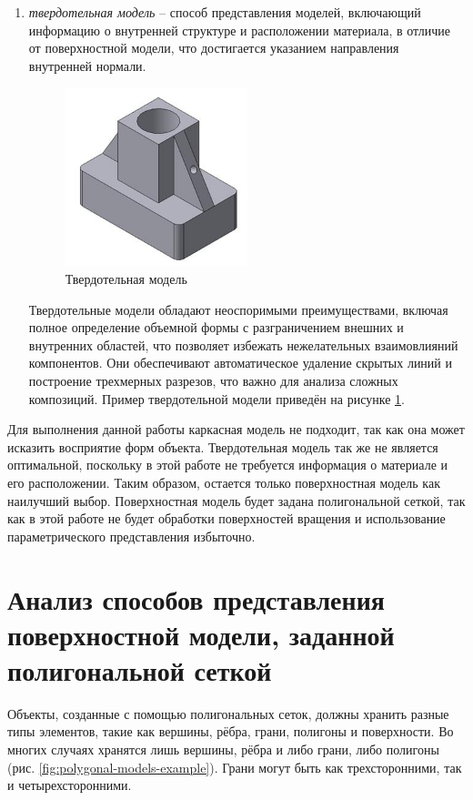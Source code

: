 \begin{enumerate}
	\item \textit{твердотельная модель} -- способ представления моделей, включающий информацию о внутренней структуре и расположении материала, в отличие от поверхностной модели, что достигается указанием направления внутренней нормали.
	\begin{figure}[h] 
		\centering
		\includegraphics[width=0.5\textwidth]{images/solidum-statu-models.png}
		\caption{Твердотельная модель} 
		\label{fig:solidum-statu-models} 
	\end{figure}
	Твердотельные модели обладают неоспоримыми преимуществами, включая полное определение объемной формы с разграничением внешних и внутренних областей, что позволяет избежать нежелательных взаимовлияний компонентов. Они обеспечивают автоматическое удаление скрытых линий и построение трехмерных разрезов, что важно для анализа сложных композиций. Пример твердотельной модели приведён на рисунке \ref{fig:solidum-statu-models}.
\end{enumerate}
	
Для выполнения данной работы каркасная модель не подходит, так как она может исказить восприятие форм объекта. Твердотельная модель так же не является оптимальной, поскольку в этой работе не требуется информация о материале и его расположении. Таким образом, остается только поверхностная модель как наилучший выбор. Поверхностная модель будет задана полигональной сеткой, так как в этой работе не будет обработки поверхностей вращения и использование параметрического представления избыточно.

\section{Анализ способов представления поверхностной модели, заданной полигональной сеткой}

Объекты, созданные с помощью полигональных сеток, должны хранить разные типы элементов, такие как вершины, рёбра, грани, полигоны и поверхности. Во многих случаях хранятся лишь вершины, рёбра и либо грани, либо полигоны (рис. \ref{fig:polygonal-models-example}). Грани могут быть как трехсторонними, так и четырехсторонними.

